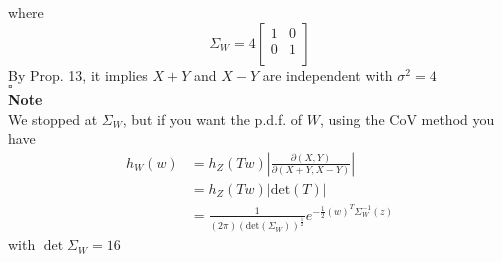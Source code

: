 \documentclass[12pt]{article}
\begin{document}
where 
\[
   \Sigma_{W}  = 4 \begin{bmatrix}
      1 &  0 \\
      0 &  1 \\
   \end{bmatrix}
\] 
By Prop. 13, it implies \(X+Y\) and \(X-Y\) are independent with \(\sigma ^{2} = 4 \) \\
\hspace{\textwidth}\(\square\) \\
\textbf{Note}\\
We stopped at \(\Sigma_{W} \), but if you want the p.d.f. of \(W\), using the CoV method you have 
\begin{equation*}
    \begin{aligned}
   h_W(w) &= h_Z(Tw) \left\vert \frac{\partial (X,Y)}{\partial (X+Y,X-Y)} \right\vert  
         \\ &= h_Z(Tw) |\text{det}(T)|
         \\ &=   \frac{1}{(2\pi) (\text{det}(\Sigma_W) )^{\frac{1}{2}}} e^{-\frac{1}{2} (w)^T \Sigma_W ^{-1} (z) }
    \end{aligned}
\end{equation*}
with \(\det{\Sigma_W} = 16\) 
 
\end{document}
